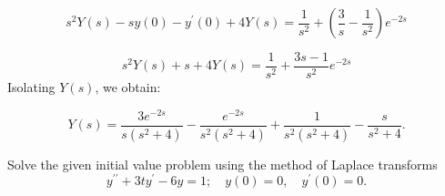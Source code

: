 \documentclass[11pt]{article}
\begin{document}
\begin{solution}
\begin{equation*}
s^2 Y(s) - s y(0)-y^{\prime}(0) +4 Y(s) = \frac{1}{s^{2}}+ \left( \frac{3}{s}-\frac{1}{s^{2}} \right)e^{-2s}
\end{equation*}


\begin{equation*}
s^2 Y(s) + s +4 Y(s) =\frac{1}{s^{2}}+ \frac{3s-1}{s^{2}} e^{-2s}
\end{equation*}
Isolating $Y(s)$, we obtain:

\begin{equation*}
\boxed{Y(s) = \dfrac{3e^{-2s}}{s(s^2+4)} -\dfrac{e^{-2s}}{s^2(s^2+4)} + \dfrac{1}{s^2(s^2+4)} -\dfrac{s}{s^2+4}}.
\end{equation*}
\end{solution}


\begin{problem}
Solve the given initial value problem using the method of Laplace transforms
\begin{equation*}
y^{\prime \prime} + 3 t y^{\prime} - 6y = 1 ; \quad y(0)=0, \quad y^{\prime}(0) = 0.
\end{equation*}
\end{problem}
\end{document}
